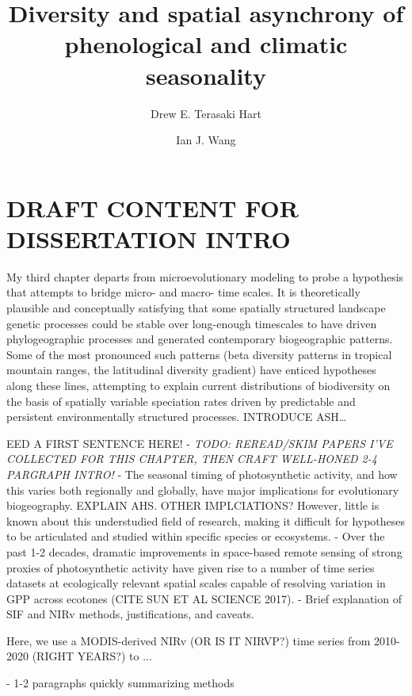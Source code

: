 \documentclass[9pt,twocolumn,twoside,lineno]{pnas-new}
\title{Diversity and spatial asynchrony of phenological and climatic seasonality}
\author[a,1]{Drew E. Terasaki Hart}
\author[a]{Ian J. Wang}
\affil[a]{Department of Environmental Science, Policy, and Management, University of California, Berkeley, CA 94720}
\begin{document}
\maketitle
\thispagestyle{firststyle}

\section*{DRAFT CONTENT FOR DISSERTATION INTRO}
My third chapter departs from microevolutionary modeling to probe a
hypothesis that attempts to bridge micro- and macro- time scales. It is
theoretically plausible and conceptually satisfying that some spatially
structured landscape genetic processes could be stable over long-enough
timescales to have driven phylogeographic processes and generated
contemporary biogeographic patterns. Some of the most pronounced such
patterns (beta diversity patterns in tropical mountain ranges, the
latitudinal diversity gradient) have enticed hypotheses along these lines,
attempting to explain current distributions of biodiversity on the basis
of spatially variable speciation rates driven by predictable and
persistent environmentally structured processes. INTRODUCE ASH…

EED A FIRST SENTENCE HERE!
- \textit{TODO: REREAD/SKIM PAPERS I'VE COLLECTED FOR THIS CHAPTER, THEN CRAFT WELL-HONED 2-4 PARGRAPH INTRO!}
- The seasonal timing of photosynthetic activity, and how this varies both regionally and globally, have major implications for evolutionary biogeography. EXPLAIN AHS. OTHER IMPLCIATIONS?
However, little is known about this understudied field of research,
making it difficult for hypotheses to be articulated and studied within
specific species or ecosystems.
- Over the past 1-2 decades, dramatic improvements in space-based remote sensing of strong proxies of photosynthetic activity have given rise to a number of time series datasets at ecologically relevant spatial scales capable of resolving variation in GPP across ecotones (CITE SUN ET AL SCIENCE 2017).
- Brief explanation of SIF and NIRv methods, justifications, and caveats.

Here, we use a MODIS-derived NIRv (OR IS IT NIRVP?) time series from 2010-2020 (RIGHT YEARS?) to ...

- 1-2 paragraphs quickly summarizing methods
\end{document}
